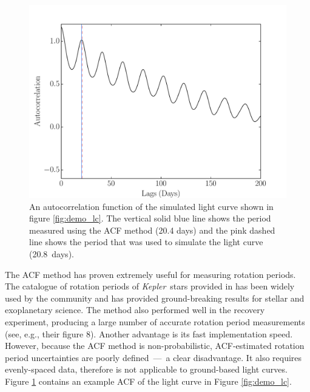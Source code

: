 \documentclass[a4paper,fleqn,usenatbib,useAMS]{mnras}
\newcommand{\Kepler}{{\it Kepler}}
\newcommand{\aigrainexampleperiod}{20.8}
\begin{document}
\begin{figure}
\begin{center}
\includegraphics[width=\columnwidth, clip=true]{figures/demo_ACF.pdf}
\caption[ACF of a simulated light curve.]
{An autocorrelation function of the simulated light curve shown in figure
\ref{fig:demo_lc}.
The vertical solid blue line shows the period measured using the ACF method (20.4
days) and the pink dashed line shows the period that was used to simulate the
light curve (\aigrainexampleperiod\ days).}
\label{fig:demo_acf}
\end{center}
\end{figure}

The ACF method has proven extremely useful for measuring rotation periods.
The catalogue of rotation periods of \Kepler\ stars provided in
\citet{Mcquillan2013} has been widely used by the community and has provided
ground-breaking results for stellar and exoplanetary science.
The method also performed well in the \citet{Aigrain2015}
recovery experiment,
producing a large number of accurate rotation period measurements
(see, e.g., their figure 8).
Another advantage is its fast implementation speed.
However, because the ACF method is non-probabilistic, ACF-estimated rotation
period uncertainties are poorly defined~---~a clear disadvantage.
It also requires evenly-spaced data, therefore is not applicable to
ground-based light curves.
Figure \ref{fig:demo_acf} contains an example ACF of the light curve in
Figure \ref{fig:demo_lc}.
\end{document}
